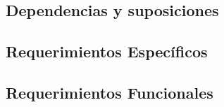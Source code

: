 \documentclass{report}
\begin{document}
        \subsection*{Dependencias y suposiciones}

    \newpage
    
    \begin{center}
        \section*{Requerimientos Específicos}
    \end{center}

    \vspace{0.5cm}

        \subsection*{Requerimientos Funcionales}
\end{document}

